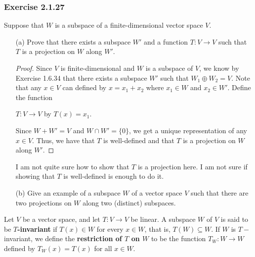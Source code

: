 \subsubsection{Exercise 2.1.27} Suppose that \( W  \) is a subspace of a finite-dimensional vector space \( V  \).
\begin{enumerate}
    \item[(a)] Prove that there exists a subspace \( W' \) and a function \( T: V \to V  \) such that \( T  \) is a projection on \( W  \) along \( W' \).
        \begin{proof}
        Since \( V  \) is finite-dimensional and \( W  \) is a subspace of \( V  \), we know by Exercise 1.6.34 that there exists a subspace \( W' \) such that \( W_{1} \oplus  W_{2} = V  \). Note that any \( x \in V  \) can defined by \( x = x_{1} + x_{2} \) where \( x_{1} \in W  \) and \( x_{2} \in W' \). Define the function 
        \begin{center}
            \( T: V \to V  \) by  \( T(x) = x_{1} \).
        \end{center} 
        Since \( W + W' = V  \) and \( W \cap W' = \{ 0  \}  \), we get a unique representation of any \( x \in V  \). Thus, we have that \( T \) is well-defined and that \( T  \) is a projection on \( W  \) along \( W' \). 
        \end{proof}
        \begin{remark}
           I am not quite sure how to show that \( T  \) is a projection here. I am not sure if showing that \( T  \) is well-defined is enough to do it.
        \end{remark}
    \item[(b)] Give an example of a subspace \( W  \) of a vector space \( V  \) such that there are two projections on \( W  \) along two (distinct) subspaces.
       \begin{solution}
       
       \end{solution} 
\end{enumerate}

\begin{definition}[Invariance]\label{Invariance}
    Let \( V  \) be a vector space, and let \( T: V \to V  \) be linear. A subspace \( W  \) of \( V  \) is said to be \textbf{\( T \)-invariant} if \( T(x) \in W  \) for every \( x \in W  \), that is, \( T(W) \subseteq W  \). If \( W  \) is  \( T- \)invariant, we define the \textbf{restriction of \( T \) on \( W  \)} to be the function \( T_{W} : W \to W  \) defined by \( T_{W}(x) = T(x) \) for all \( x \in W  \).
\end{definition}


